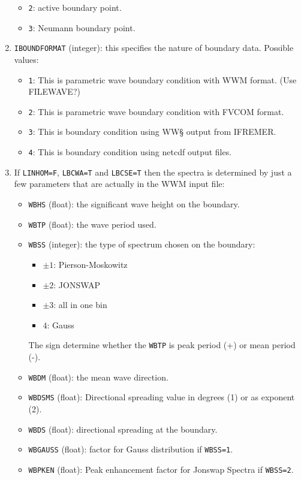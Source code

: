 \documentclass[12pt]{amsart}
\begin{document}
\begin{enumerate}
\begin{itemize}
  \item {\tt 2}: active boundary point.
  \item {\tt 3}: Neumann boundary point.
  \end{itemize}
\item {\tt IBOUNDFORMAT} (integer): this specifies the nature of boundary data. Possible values:
  \begin{itemize}
  \item {\tt 1}: This is parametric wave boundary condition with WWM format. (Use FILEWAVE?)
  \item {\tt 2}: This is parametric wave boundary condition with FVCOM format. 
  \item {\tt 3}: This is boundary condition using WW§ output from IFREMER.
  \item {\tt 4}: This is boundary condition using netcdf output files.
  \end{itemize}
\item If {\tt LINHOM=F}, {\tt LBCWA=T} and {\tt LBCSE=T} then the spectra is determined by just a few parameters that are actually in the WWM input file:
  \begin{itemize}
  \item {\tt WBHS} (float): the significant wave height on the boundary.
  \item {\tt WBTP} (float): the wave period used.
  \item {\tt WBSS} (integer): the type of spectrum chosen on the boundary:
    \begin{itemize}
    \item $\pm 1$: Pierson-Moskowitz
    \item $\pm 2$: JONSWAP
    \item $\pm 3$: all in one bin
    \item $4$: Gauss
    \end{itemize}
    The sign determine whether the {\tt WBTP} is peak period (+) or mean period (-).
  \item {\tt WBDM} (float): the mean wave direction.
  \item {\tt WBDSMS} (float): Directional spreading value in degrees (1) or as exponent (2).
  \item {\tt WBDS} (float): directional spreading at the boundary.
  \item {\tt WBGAUSS} (float): factor for Gauss distribution if {\tt WBSS=1}.
  \item {\tt WBPKEN} (float):  Peak enhancement factor for Jonswap Spectra if {\tt WBSS=2}.
  \end{itemize}

\end{enumerate}
\end{document}
